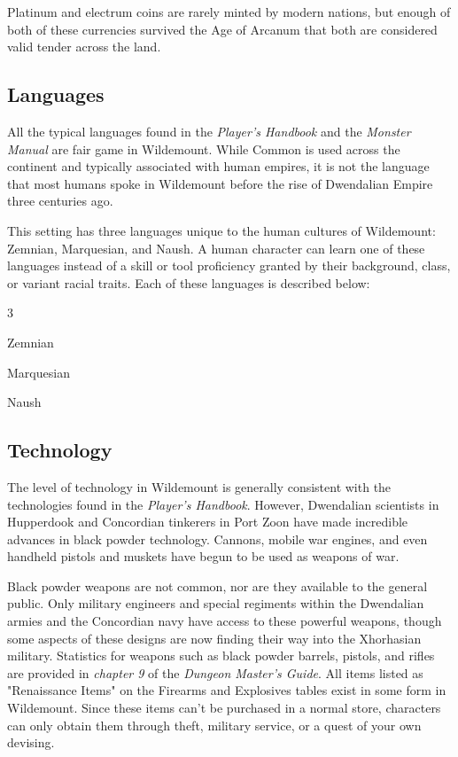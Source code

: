 \documentclass[10pt,a4paper,twoside,bg=print,twocolumn,openany,nodeprecatedcode]{dndbook}
\begin{document}
Platinum and electrum coins are rarely minted by modern nations, but enough of both of these currencies survived the Age of Arcanum that both are considered valid tender across the land.

\subsection{Languages}
All the typical languages found in the \textit{Player's Handbook} and the \textit{Monster Manual} are fair game in Wildemount. While Common is used across the continent and typically associated with human empires, it is not the language that most humans spoke in Wildemount before the rise of Dwendalian Empire three centuries ago.

This setting has three languages unique to the human cultures of Wildemount: Zemnian, Marquesian, and Naush. A human character can learn one of these languages instead of a skill or tool proficiency granted by their background, class, or variant racial traits. Each of these languages is described below:


\begin{itemize}
\begin{multicols}{3}
\item Zemnian
\item Marquesian
\item Naush
\end{multicols}

\end{itemize}

\subsection{Technology}
The level of technology in Wildemount is generally consistent with the technologies found in the \textit{Player's Handbook}. However, Dwendalian scientists in Hupperdook and Concordian tinkerers in Port Zoon have made incredible advances in black powder technology. Cannons, mobile war engines, and even handheld pistols and muskets have begun to be used as weapons of war.

Black powder weapons are not common, nor are they available to the general public. Only military engineers and special regiments within the Dwendalian armies and the Concordian navy have access to these powerful weapons, though some aspects of these designs are now finding their way into the Xhorhasian military. Statistics for weapons such as black powder barrels, pistols, and rifles are provided in \textit{chapter 9} of the \textit{Dungeon Master's Guide}. All items listed as "Renaissance Items" on the Firearms and Explosives tables exist in some form in Wildemount. Since these items can't be purchased in a normal store, characters can only obtain them through theft, military service, or a quest of your own devising.
\end{document}

